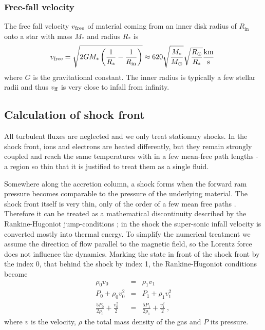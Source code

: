 \subsubsection{Free-fall velocity}
The free fall velocity $v_{\textnormal{free}}$ of material coming from an inner disk radius of $R_\mathrm{in}$ onto a star with mass $M_*$ and radius $R_*$ is
\begin{equation} 
v_{\textnormal{free}} = \sqrt{{2GM_*} \left(\frac{1}{R_*} - \frac{1}{R_\mathrm{in}}\right)} \approx 620 \sqrt{\frac{M_*}{M_\odot}}\sqrt{\frac{R_\odot}{R_*}} \frac{\textnormal{km}}{\textnormal{s}}\ \label{eqn:freefall} 
\end{equation}
where $G$ is the gravitational constant. The inner radius is typically a few stellar radii and thus $v_\textnormal{ff}$ is very close to infall from infinity.


\subsection{Calculation of shock front}
All turbulent fluxes are neglected and we only treat stationary shocks. In the shock front, ions and electrons are heated differently, but they remain strongly coupled and reach the same temperatures with in a few mean-free path lengths - a region so thin that it is justified to treat them as a single fluid. 

Somewhere along the accretion column, a shock forms when the forward ram pressure becomes comparable to the pressure of the underlying material. The shock front itself is very thin, only of the order of a few mean free paths \cite{raizerzeldovich}. Therefore it can be treated as a mathematical discontinuity described by the Rankine-Hugoniot jump-conditions \cite[][chap.~7, \S~15]{raizerzeldovich}; in the shock the super-sonic infall velocity is converted mostly into thermal energy. To simplify the numerical treatment we assume the direction of flow parallel to the magnetic field, so the Lorentz force does not influence the dynamics. Marking the state in front of the shock front by the index 0, that behind the shock by index 1, the Rankine-Hugoniot conditions become
\begin{eqnarray}
\rho_0 v_0 &=& \rho_1 v_1 \label{RH1}\\
P_0+\rho_0 v_0^2 &=& P_1+\rho_1 v_1^2 \label{RH2}\\
\frac{5 P_0}{2\rho_0}+\frac{v_0^2}{2}&=&\frac{5 P_1}{2\rho_1}+\frac{v_1^2}{2} \ ,\label{RH3}
\end{eqnarray}
where $v$ is the velocity, $\rho$ the total mass density of the gas and $P$ its pressure. 

